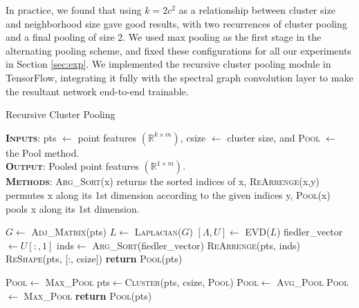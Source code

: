 \documentclass[runningheads]{llncs}
\begin{document}
In practice, we found that using $k = 2 c^2$ as a relationship between cluster size and neighborhood size gave good results, with two recurrences of cluster pooling and a final pooling of size 2. We used max pooling as the first stage in the alternating pooling scheme, and fixed these configurations for all our experiments in Section \ref{sec:exp}. We implemented the recursive cluster pooling module in TensorFlow, integrating it fully with the spectral graph convolution layer to make the resultant network end-to-end trainable.


\medskip
\begin{algorithm}[t]
	\small
	\caption{Recursive Cluster Pooling}
	\label{algorithm1}
	\hspace*{\algorithmicindent}\textbf{\textsc{Inputs}}: pts $\gets$ point features $(\mathbb{R}^{k \times m})$, csize $\gets$ cluster size, and \textsc{Pool} $\gets$ the Pool method.\\
	\hspace*{\algorithmicindent}\textbf{\textsc{Output}}: Pooled point features $(\mathbb{R}^{1 \times m})$.\\
	\hspace*{\algorithmicindent}\textbf{\textsc{Methods}}: \textsc{Arg\_Sort}(x) returns the sorted indices of x, \textsc{ReArrenge}(x,y) permutes x along its 1st dimension according to the given indices y,  \textsc{Pool}(x) pools x along its 1st dimension.

	\begin{multicols}{2}
		
		\begin{algorithmic}
			\State $G\gets$ \textsc{Adj\_Matrix}(pts)
			\State $L\gets$ \textsc{Laplacian($G$)}
			\State $[\Lambda, U]\gets$ \textsc{EVD}($L$)
			\State fiedler\_vector$\gets U[:,1]$ \State inds$\gets$ \textsc{Arg\_Sort}(fiedler\_vector)
			\State \textsc{ReArrenge}(pts, inds)
			\State \textsc{ReShape}(pts, [:, csize])
			\State \textbf{return} \textsc{Pool}(pts)\EndProcedure

			\State \textsc{Pool}$\gets$ \textsc{Max\_Pool}
			\State pts$\gets$\textsc{Cluster}(pts, csize, \textsc{Pool})
			\State \textsc{Pool}$\gets$ \textsc{Avg\_Pool}
			\Else
			\State \textsc{Pool}$\gets$ \textsc{Max\_Pool}
			\EndIf
			\EndWhile
			\State \textbf{return}  \textsc{Pool}(pts)\EndProcedure
			
		\end{algorithmic}
	\end{multicols}
\end{algorithm}
\end{document}
